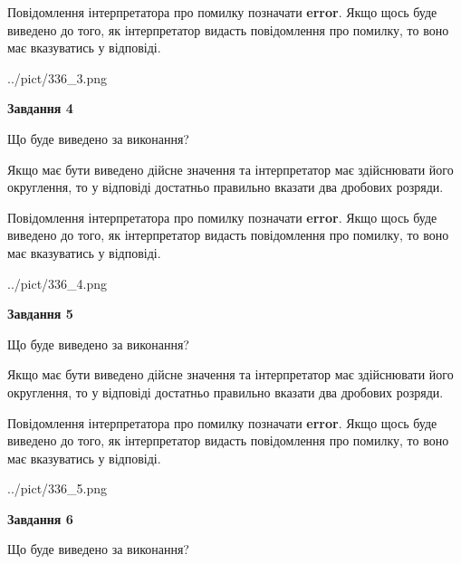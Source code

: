 \documentclass[12pt, ukrainian]{article}
\begin{document}
{\begin {Large}
Повідомлення інтерпретатора про помилку позначати \textbf{error}.
Якщо щось буде виведено до того, як інтерпретатор видасть повідомлення про помилку, 
то воно має вказуватись у відповіді. \par

\begin{center}
	{../pict/336_3.png}
\end{center}
\newpage

{\begin {center}\textbf{Завдання 4}\end {center}}\par
Що буде виведено за виконання? \par

Якщо має бути виведено дійсне значення та інтерпретатор має здійснювати його округлення, 
то у відповіді достатньо правильно вказати два дробових розряди.

Повідомлення інтерпретатора про помилку позначати \textbf{error}.
Якщо щось буде виведено до того, як інтерпретатор видасть повідомлення про помилку, 
то воно має вказуватись у відповіді. \par

\begin{center}
	{../pict/336_4.png}
\end{center}
\newpage

{\begin {center}\textbf{Завдання 5}\end {center}}\par
Що буде виведено за виконання? \par

Якщо має бути виведено дійсне значення та інтерпретатор має здійснювати його округлення, 
то у відповіді достатньо правильно вказати два дробових розряди.

Повідомлення інтерпретатора про помилку позначати \textbf{error}.
Якщо щось буде виведено до того, як інтерпретатор видасть повідомлення про помилку, 
то воно має вказуватись у відповіді. \par

\begin{center}
	{../pict/336_5.png}
\end{center}
\newpage

{\begin {center}\textbf{Завдання 6}\end {center}}\par
Що буде виведено за виконання? \par


\end{Large}}
\end{document}
